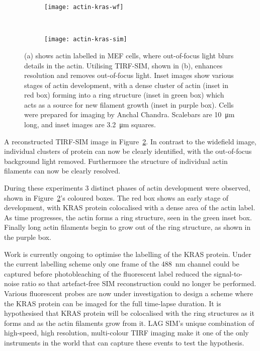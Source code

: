 \begin{figure}[tbp!]
\centering
\begin{subfigure}[b]{0.85\textwidth}
	\texttt{[image: actin-kras-wf]}
	\caption{}\label{fig:widefield-actin}
\end{subfigure}

~\newline
\begin{subfigure}[b]{0.85\textwidth}
	\texttt{[image: actin-kras-sim]}
	\caption{}\label{fig:recon-tirf-actin}
\end{subfigure}
\caption[LAG SIM: TIRF-SIM imaging of actin in MEF cells removes out-of-focus light allowing actin development to be studied]{(a) shows actin labelled in MEF cells, where out-of-focus light blurs details in the actin. Utilising TIRF-SIM, shown in (b), enhances resolution and removes out-of-focus light. Inset images show various stages of actin development, with a dense cluster of actin (inset in red box) forming into a ring structure (inset in green box) which acts as a source for new filament growth (inset in purple box). Cells were prepared for imaging by Anchal Chandra. Scalebars are \SI{10}{\micro\metre} long, and inset images are \SI{3.2}{\micro\metre} squares.}
\label{fig:recon-actin}
\end{figure}
\afterpage{\clearpage}

A reconstructed TIRF-SIM image in Figure~\ref{fig:recon-tirf-actin}. 
In contrast to the widefield image, individual clusters of protein can now be clearly identified, with the out-of-focus background light removed. 
Furthermore the structure of individual actin filaments can now be clearly resolved.

During these experiments 3 distinct phases of actin development were observed, shown in Figure~\ref{fig:recon-tirf-actin}'s coloured boxes.
The red box shows an early stage of development, with KRAS protein colocalised with a dense area of the actin label. 
As time progresses, the actin forms a ring structure, seen in the green inset box. 
Finally long actin filaments begin to grow out of the ring structure, as shown in the purple box.

Work is currently ongoing to optimise the labelling of the KRAS protein.
Under the current labelling scheme only one frame of the \SI{488}{\nano\metre} channel could be captured before photobleaching of the fluorescent label reduced the signal-to-noise ratio so that artefact-free SIM reconstruction could no longer be performed. 
Various fluorescent probes are now under investigation to design a scheme where the KRAS protein can be imaged for the full time-lapse duration. 
It is hypothesised that KRAS protein will be colocalised with the ring structures as it forms and as the actin filaments grow from it.
LAG SIM's unique combination of high-speed, high resolution, multi-colour TIRF imaging make it one of the only instruments in the world that can capture these events to test the hypothesis. 


